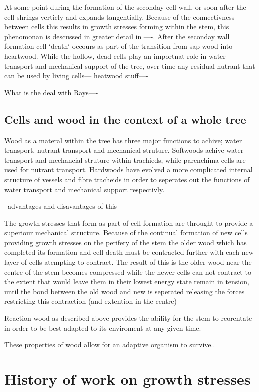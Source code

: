 \documentclass{article}
\begin{document}
At some point during the formation of the seconday cell wall, or soon after the
cell shrings verticly and expands tangentially. Because of the connectivness
between cells this results in growth stresses forming within the stem, this
phenomonan is descussed in greater detail in ----. After the seconday wall
formation cell `death` occours as part of the transition from sap wood into
heartwood. While the hollow, dead cells play an importnat role in water
transport and mechanical support of the tree, over time any residual nutrant
that can be used by living cells--- heatwood stuff----

What is the deal with Rays----

\subsection{Cells and wood in the context of a whole tree}
Wood as a materal within the tree has three major functions to achive; water
transport, nutrant transport and mechanical struture. Softwoods achive
water transport and mechancial struture within trachieds, while parenchima cells
are used for nutrant transport. Hardwoods have evolved a more complicated
internal structure of vessels and fibre tracheids in order to seperates out the
functions of water transport and mechanical support respectivly.

--advantages and disavantages of this--

The growth stresses that form as part of cell formation are throught to provide
a superiour mechanical structure. Because of the continual formation of new
cells providing growth stresses on the perifery of the stem the older wood which
has completed its formation and cell death must be contracted further with each
new layer of cells atempting to contract. The result of this is the older wood
near the centre of the stem becomes compressed while the newer cells can not
contract to the extent that would leave them in their lowest energy state
remain in tension, until the bond between the old wood and new is seperated
releasing the forces restricting this contraction (and extention in the centre)

Reaction wood as described above provides the ability for the stem to reorentate
in order to be best adapted to its enviroment at any given time.

These properties of wood allow for an adaptive organism to survive..

\section{History of work on growth stresses}
\end{document}
